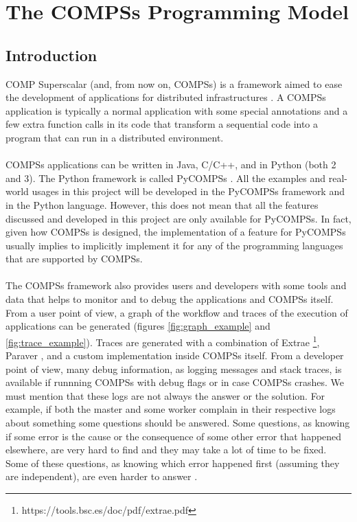 \section{The COMPSs Programming Model}
\label{sec:compss}
\subsection{Introduction}
COMP Superscalar (and, from now on, COMPSs) is a framework aimed to ease the development of applications for distributed infrastructures \cite{compss} \cite{Lordan2014}. A COMPSs application is typically a normal application with some special annotations and a few extra function calls in its code that transform a sequential code into a program that can run in a distributed environment.\\
\\
COMPSs applications can be written in Java, C/C++, and in Python (both 2 and 3). The Python framework is called PyCOMPSs \cite{pycompss}. All the examples and real-world usages in this project will be developed in the PyCOMPSs framework and in the Python language. However, this does not mean that all the features discussed and developed in this project are only available for PyCOMPSs. In fact, given how COMPSs is designed, the implementation of a feature for PyCOMPSs usually implies to implicitly implement it for any of the programming languages that are supported by COMPSs.\\
\\
The COMPSs framework also provides users and developers with some tools and data that helps to monitor and to debug the applications and COMPSs itself. From a user point of view, a graph of the workflow and traces of the execution of applications can be generated (figures \ref{fig:graph_example}  and \ref{fig:trace_example}). Traces are generated with a combination of Extrae \footnote{https://tools.bsc.es/doc/pdf/extrae.pdf}, Paraver \cite{paraver}, and a custom implementation inside COMPSs itself. From a developer point of view, many debug information, as logging messages and stack traces, is available if runnning COMPSs with debug flags or in case COMPSs crashes. We must mention that these logs are not always the answer or the solution. For example, if both the master and some worker complain in their respective logs about something some questions should be answered. Some questions, as knowing if some error is the cause or the consequence of some other error that happened elsewhere, are very hard to find and they may take a lot of time to be fixed.  Some of these questions, as knowing which error happened first (assuming they are independent), are even harder to answer \cite{Lamport}. 


